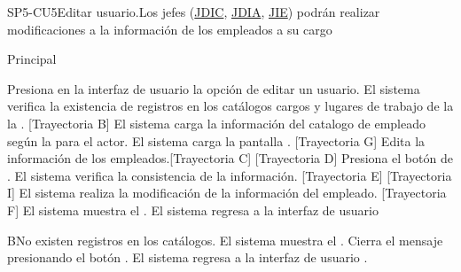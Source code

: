 \begin{UseCase}{SP5-CU5}{Editar usuario.}{Los jefes (\hyperlink{JDIC}{JDIC}, \hyperlink{JDIA}{JDIA}, \hyperlink{JIE}{JIE}) podrán realizar modificaciones a la información de los empleados   a su cargo}
{\begin{itemize}
            \end{itemize}
        }

\end{UseCase}

\begin{UCtrayectoria}{Principal}
    
    \UCpaso[\UCactor] Presiona en la interfaz de usuario  la opción de editar un usuario. 
    \UCpaso  El sistema verifica la existencia de registros en los catálogos cargos  y  lugares de trabajo de la la  . [Trayectoria B] 
    \UCpaso El sistema carga la información del catalogo de empleado  según la  para el actor.
    \UCpaso El sistema carga la pantalla  . [Trayectoria G] 
    \UCpaso[\UCactor] Edita la información de los empleados.[Trayectoria C] [Trayectoria D]
    \UCpaso[\UCactor]  Presiona el botón de .
    \UCpaso El sistema verifica la consistencia de la información. [Trayectoria E] [Trayectoria I]
    \UCpaso El sistema realiza la modificación de la información del empleado. [Trayectoria F] 
    \UCpaso  El sistema muestra el .    
    \UCpaso El sistema regresa a la interfaz de usuario 
\end{UCtrayectoria}

\begin{UCtrayectoriaA}{B}{No existen registros en los catálogos.}
    \UCpaso     El sistema muestra el .
    \UCpaso[\UCactor] Cierra el mensaje presionando el botón .
    \UCpaso El sistema regresa a la interfaz de usuario .
\end{UCtrayectoriaA}

